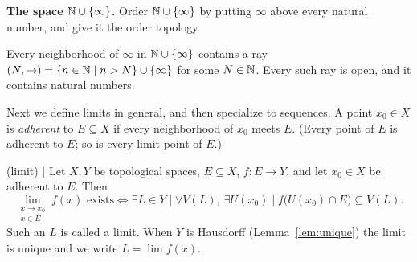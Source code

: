 \noindent\textbf{The space $\mathbb{N}\cup\{\infty\}$.} Order $\mathbb{N}\cup\{\infty\}$ by
putting $\infty$ above every natural number, and give it the order topology.

\begin{lemma} \label{lem:infty}
Every neighborhood of $\infty$ in $\mathbb{N}\cup\{\infty\}$ contains a ray
$(N,\to) = \{n\in\mathbb{N} \mid n>N\}\cup\{\infty\}$ for some $N\in\mathbb{N}$. Every such ray
is open, and it contains natural numbers.
\end{lemma}

\bigskip

Next we define limits in general, and then specialize to sequences.
A point $x_0\in X$ is \emph{adherent} to $E\subseteq X$ if every neighborhood
of $x_0$ meets $E$. (Every point of $E$ is adherent to $E$; so is every limit
point of $E$.)

\begin{definition} (limit) $\mid$ \label{def:limit}
Let $X,Y$ be topological spaces, $E\subseteq X$, $f:E\to Y$, and let $x_0\in X$
be adherent to $E$. Then
    \[
    \lim_{\substack{x \to x_0 \\ x \in E}} f(x)
    \text{ exists}
    \iff
    \exists L\in Y \mid
    \forall V(L),\ \exists U(x_0)
    \mid
    f\big(U(x_0)\cap E\big)\subseteq V(L).
    \]
Such an $L$ is called a limit. When $Y$ is Hausdorff (Lemma~\ref{lem:unique})
the limit is unique and we write $L = \lim f(x)$.
\end{definition}

